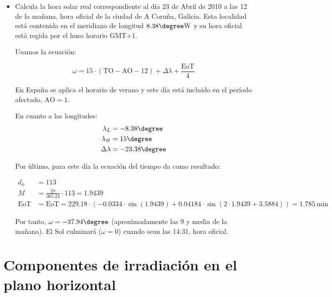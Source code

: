 \begin{itemize}
\item Calcula la hora solar real correspondiente al día 23 de Abril de
  2010 a las 12 de la mañana, hora oficial de la ciudad de A Coruña,
  Galicia. Esta localidad está contenida en el meridiano de longitud
  $8.38\degree\mathrm{W}$ y su hora oficial está regida por el huso
  horario GMT+1.

  Usamos la ecuación:
  
  \[
    \omega=15\cdot(\mathrm{TO}-\mathrm{AO}-12)+\Delta\lambda+\frac{\mathrm{EoT}}{4}
  \]

  En España se aplica el horario de verano y este día está incluido en
  el período afectado, $\mathrm{AO}=1$.

  En cuanto a las longitudes:
  \begin{align*}
    \lambda_{L} &= -8.38\degree\\
    \lambda_{H} &= 15\degree\\
    \Delta\lambda &= -23.38\degree
  \end{align*}
  

  Por último, para este día la ecuación del tiempo da como resultado:

  \begin{align*}
    d_n &= 113\\
    M &=\frac{2\pi}{365.24}\cdot 113 = 1.9439\\
    \mathrm{EoT}&=\mathrm{EoT}=229.18\cdot\left(-0.0334\cdot\sin(1.9439) + 0.04184\cdot\sin\left(2\cdot
                  1.9439 + 3.5884\right)\right) = \SI{1.785}{\minute}
  \end{align*}
  
  Por tanto, $\omega=-37.94\degree$ (aproximadamente las 9 y media de
  la mañana). El Sol culminará ($\omega=0$) cuando sean las 14:31,
  hora oficial.

\end{itemize}



\section{Componentes de irradiación en el plano horizontal}



